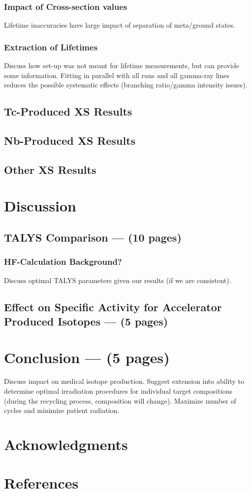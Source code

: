 \documentclass[final,3p,times,twocolumn,authoryear]{elsarticle_modified}
\begin{document}
	\subsubsection{Impact of Cross-section values}
	Lifetime inaccuracies have large impact of separation of meta/ground states. 
	\subsubsection{Extraction of Lifetimes}
	Discuss how set-up was not meant for lifetime measurements, but can provide some information. Fitting in parallel with all runs and all gamma-ray lines reduces the possible systematic effects (branching ratio/gamma intensity issues).
\subsection{Tc-Produced XS Results}
\label{TcXS}
\subsection{Nb-Produced XS Results}
\label{NbXS}
\subsection{Other XS Results}
\label{PNXS}

\section{Discussion}
\label{Discussion}
\subsection{TALYS Comparison --- (10 pages)}
\label{Talys}
\subsubsection{HF-Calculation Background?}
Discuss optimal TALYS parameters given our results (if we are consistent).

\subsection{Effect on Specific Activity for Accelerator Produced Isotopes --- (5 pages)} %

\section{Conclusion --- (5 pages)} %
\label{Conclusion}
Discuss impact on medical isotope production. Suggest extension into ability to determine optimal irradiation procedures for individual target compositions (during the recycling process, composition will change). Maximize number of cycles and minimize patient radiation.

\section*{Acknowledgments}
\label{Acknowledgements}


\section*{References}
\label{Ref}
\end{document}
